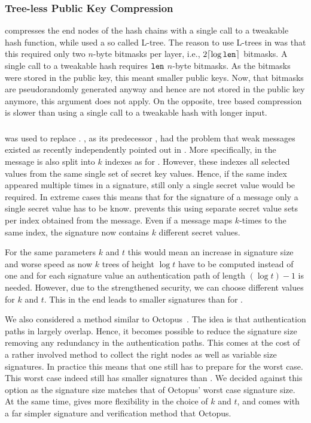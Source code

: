 \subsubsection{Tree-less \wotsp Public Key Compression}
\spx compresses the end nodes of the \wotsp hash chains with a single call 
to a tweakable hash function, while \spc used a so called L-tree.
The reason to use L-trees in \spc was that this required only two 
$n$-byte bitmasks per layer, i.e., $2\lceil\log \texttt{len}\rceil$ bitmasks. A single call 
to a tweakable hash requires $\texttt{len}$ $n$-byte bitmasks. 
As the bitmasks were stored in the public key, this meant 
smaller public keys. Now, that bitmasks are pseudorandomly generated anyway and 
hence are not stored in the public key anymore,
this argument does not apply. On the opposite, tree based compression 
is slower than using a single call to a tweakable hash with longer input.

\subsubsection{\fors} \label{sec:changes:fors}
\fors was used to replace \horst. \horst, as its predecessor
\hors, had the problem that weak messages existed as recently independently 
pointed out in \cite{Aumasson2017}. More specifically, in \horst the message 
is also split into $k$ indexes as for \fors. However, these indexes all selected 
values from the same single set of secret key values. Hence, if the same index 
appeared multiple times in a signature, still only a single secret value would be 
required. In extreme cases this means that for the signature of a message only 
a single secret value has to be know. \fors prevents this using separate secret 
value sets per index obtained from the message. Even if a message maps $k$-times
to the same index, the signature now contains $k$ different secret values. 

For the same parameters $k$ and $t$ this would mean an increase in signature 
size and worse speed as now $k$ trees of height $\log t$ have to be computed 
instead of one and for each signature value an authentication path of length 
$(\log t) -1$ is needed. However, due to the strengthened security, we can 
choose different values for $k$ and $t$. This in the end leads to smaller 
signatures than for \horst. 

We also considered a method similar to Octopus~\cite{Aumasson2017a}. The idea
is that authentication paths in \horst largely overlap. Hence, it becomes 
possible to reduce the signature size removing any redundancy in the 
authentication paths. This comes at the cost of a rather involved method to 
collect the right nodes as well as variable size signatures. In practice this 
means that one still has to prepare for the worst case. This worst case 
indeed still has smaller signatures than \horst. We decided against this option 
as the \fors signature size matches that of Octopus' worst case signature size.
At the same time, \fors gives more flexibility in the choice of $k$ and $t$, and
comes with a far simpler signature and verification method that Octopus.

